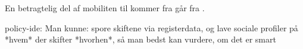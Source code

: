 En betragtelig del af mobiliten til  kommer fra  går fra . 












% 
% 
%
%












policy-ide:
Man kunne: spore skiftene via registerdata, og lave sociale profiler på *hvem* der skifter *hvorhen*, så man bedst kan vurdere, om det er smart















